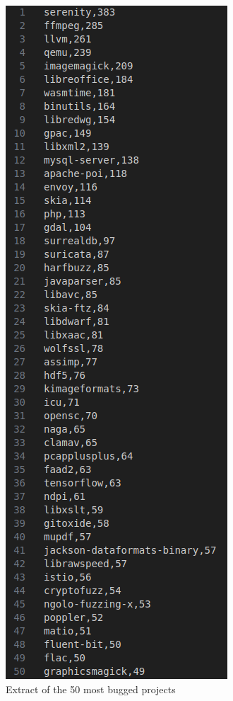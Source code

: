 \begin{figure}[h]
\centering
\includegraphics[scale=0.44]{foto/list.png}
\caption{Extract of the 50 most bugged projects}
\label{fig:list}
\end{figure}

